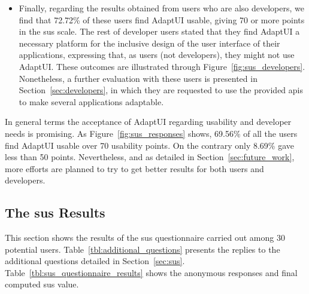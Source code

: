 \begin{itemize}
  \item Finally, regarding the results obtained from users who are also 
  developers, we find that 72.72\% of these users find AdaptUI usable, 
  giving 70 or more points in the \ac{sus} scale. The rest of developer users 
  stated that they find AdaptUI a necessary platform for the inclusive design of 
  the user interface of their applications, expressing that, as users (not 
  developers), they might not use AdaptUI. These outcomes are illustrated
  through Figure~\ref{fig:sus_developers}. Nonetheless, a further evaluation
  with these users is presented in Section~\ref{sec:developers}, in which they
  are requested to use the provided \acp{api} to make several applications
  adaptable.
\end{itemize}

In general terms the acceptance of AdaptUI regarding usability and developer
needs is promising. As Figure~\ref{fig:sus_responses} shows, 69.56\% of all 
the users find AdaptUI usable over 70 usability points. On the contrary only
8.69\% gave less than 50 points. Nevertheless, and as detailed in 
Section~\ref{sec:future_work}, more efforts are planned to try to get better
results for both users and developers.

\subsection{The \ac{sus} Results}
\label{sec:sus_results}

This section shows the results of the \ac{sus} questionnaire carried out among
30 potential users. Table~\ref{tbl:additional_questions} presents the replies 
to the additional questions detailed in Section~\ref{sec:sus}.
Table~\ref{tbl:sus_questionnaire_results} shows the anonymous responses and final
computed \ac{sus} value.

